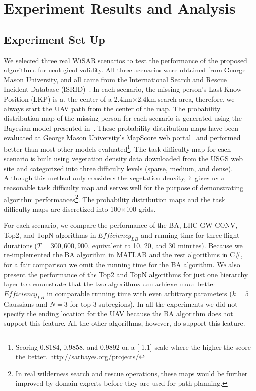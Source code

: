\documentclass[journal]{IEEEtran}
\begin{document}
\section{Experiment Results and Analysis}
\label{sec:ExperimentResultsAndAnalysis}

\subsection{Experiment Set Up}

We selected three real WiSAR scenarios to test the performance of the proposed algorithms for ecological validity. All three scenarios were obtained from George Mason University, and all came from the International Search and Rescue Incident Database (ISRID)~\cite{koester2008lost}. In each scenario, the missing person's Last Know Position (LKP) is at the center of a 2.4km$\times$2.4km search area, therefore, we always start the UAV path from the center of the map. The probability distribution map of the missing person for each scenario is generated using the Bayesian model presented in~\cite{lin2010bayesian}. These probability distribution maps have been evaluated at George Mason University's MapScore web portal~\cite{Twardy2012MapScore} and performed better than most other models evaluated\footnote{Scoring 0.8184, 0.9858, and 0.9892 on a [-1,1] scale where the higher the score the better. http://sarbayes.org/projects/}. The task difficulty map for each scenario is built using vegetation density data downloaded from the USGS web site and categorized into three difficulty levels (sparse, medium, and dense). Although this method only considers the vegetation density, it gives us a reasonable task difficulty map and serves well for the purpose of demonstrating algorithm performances\footnote{In real wilderness search and rescue operations, these maps would be further improved by domain experts before they are used for path planning.}. The probability distribution maps and the task difficulty maps are discretized into 100$\times$100 grids. 

For each scenario, we compare the performance of the BA, LHC-GW-CONV, Top2, and TopN algorithms in $\mathit{Efficiency_{LB}}$ and running time for three flight durations ($T=300,600,900$, equivalent to 10, 20, and 30 minutes). Because we re-implemented the BA algorithm in MATLAB and the rest algorithms in C\#, for a fair comparison we omit the running time for the BA algorithm. We also present the performance of the Top2 and TopN algorithms for just one hierarchy layer to demonstrate that the two algorithms can achieve much better $\mathit{Efficiency_{LB}}$ in comparable running time with even arbitrary parameters ($k=5$ Gaussians and $N=3$ for top 3 subregions). In all the experiments we did not specify the ending location for the UAV because the BA algorithm does not support this feature. All the other algorithms, however, do support this feature.
\end{document}
